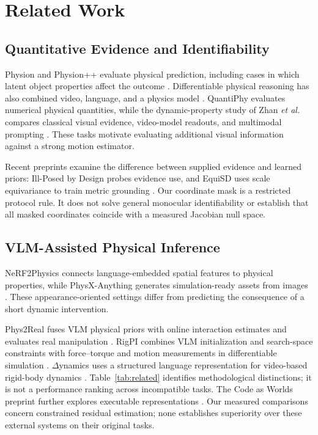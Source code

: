 \documentclass{ieeeaccess}
\begin{document}
\section{Related Work}\label{sec:related}
\subsection{Quantitative Evidence and Identifiability}
Physion and Physion++ evaluate physical prediction, including cases in which latent object properties affect the outcome \cite{bear2021physion,tung2023physionpp}. Differentiable physical reasoning has also combined video, language, and a physics model \cite{li2021dvr}. QuantiPhy evaluates numerical physical quantities, while the dynamic-property study of Zhan \emph{et al.} compares classical visual evidence, video-model readouts, and multimodal prompting \cite{puyin2026quantiphy,zhan2026idpp}. These tasks motivate evaluating additional visual information against a strong motion estimator.

Recent preprints examine the difference between supplied evidence and learned priors: Ill-Posed by Design probes evidence use, and EquiSD uses scale equivariance to train metric grounding \cite{meivar2026illposed,tan2026equisd}. Our coordinate mask is a restricted protocol rule. It does not solve general monocular identifiability or establish that all masked coordinates coincide with a measured Jacobian null space.

\subsection{VLM-Assisted Physical Inference}
NeRF2Physics connects language-embedded spatial features to physical properties, while PhysX-Anything generates simulation-ready assets from images \cite{zhai2024nerf2physics,cao2026physxanything}. These appearance-oriented settings differ from predicting the consequence of a short dynamic intervention.

Phys2Real fuses VLM physical priors with online interaction estimates and evaluates real manipulation \cite{wang2026phys2real}. RigPI combines VLM initialization and search-space constraints with force--torque and motion measurements in differentiable simulation \cite{he2026rigpi}. $\Delta$ynamics uses a structured language representation for video-based rigid-body dynamics \cite{kao2026dynamics}. Table~\ref{tab:related} identifies methodological distinctions; it is not a performance ranking across incompatible tasks. The Code as Worlds preprint further explores executable representations \cite{wang2026codeworlds}. Our measured comparisons concern constrained residual estimation; none establishes superiority over these external systems on their original tasks.
\end{document}

